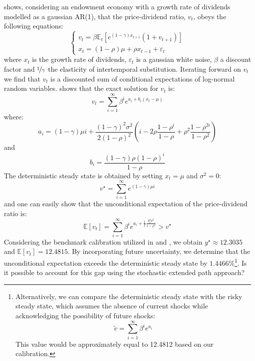 \documentclass[a4paper,12pt]{amsart}
\begin{document}
\textcite{Burnside1998} shows, considering an endowment economy with
a growth rate of dividends modelled as a gaussian AR(1), that the
price-dividend ratio, $v_t$, obeys the following equations:
\[
   \begin{cases}
      v_t = \beta \mathbb E_t\left[ e^{(1-\gamma)x_{t+1}}\left(1+v_{t+1}\right) \right] \\
      x_t = (1-\rho)\mu + \rho x_{t-1} + \varepsilon_t
   \end{cases}
\]
where $x_t$ is the growth rate of dividends, $\varepsilon_t$ is a
gaussian white noise, $\beta$ a discount factor
and $\nicefrac{1}{\gamma}$ the elasticity of intertemporal
substitution.  Iterating forward on $v_t$ we find that $v_t$ is a
discounted sum of conditional expectations of log-normal random
variables. \textcite{Burnside1998} shows that the exact solution
for $v_t$ is:
\[
   v_t = \sum_{i=1}^\infty \beta^i e^{a_i + b_i (x_t-\mu)}
\]
where:
\[
   a_i = (1-\gamma)\mu i + \frac{(1-\gamma)^2\sigma^2}{2(1-\rho)^2}\left( i - 2\rho\frac{1-\rho^i}{1-\rho} + \rho^2\frac{1-\rho^{2i}}{1-\rho^2} \right)
\]
and
\[
   b_i = \frac{(1-\gamma)\rho\left( 1-\rho \right)^i}{1-\rho}
\]
The deterministic steady state is obtained by setting $x_t=\mu$ and $\sigma^2=0$:
\[
   v^{\star} = \sum_{i=1}^\infty e^{(1-\gamma)\mu i}
\]
and one can easily show that the unconditional expectation of the price-dividend ratio is:
\[
   \mathbb E\left[v_t\right] = \sum_{i=1}^\infty \beta^ie^{a_i + \frac{1}{2}\frac{b_i^2\sigma^2}{1-\rho^2}} > v^{\star}
\]
Considering the benchmark calibration utilized in
\textcite{CollardJuillard2001} and \textcite{Burnside1998}, we
obtain $y^{\star} \approx 12.3035$
and $\mathbb{E}\left[v_t \right] = 12.4815$. By incorporating future
uncertainty, we determine that the unconditional expectation exceeds
the deterministic steady state by $1.4466\%$\footnote{Alternatively,
   we can compare the deterministic steady state with the risky steady
   state, which assumes the absence of current shocks while
   acknowledging the possibility of future shocks:
   \[
      \tilde v = \sum_{i=1}^\infty \beta^i e^{a_i}
   \]
   This value would be approximately equal to 12.4812 based on our
   calibration.}. Is it possible to account for this gap using the
stochastic extended path approach?\newline
\end{document}
